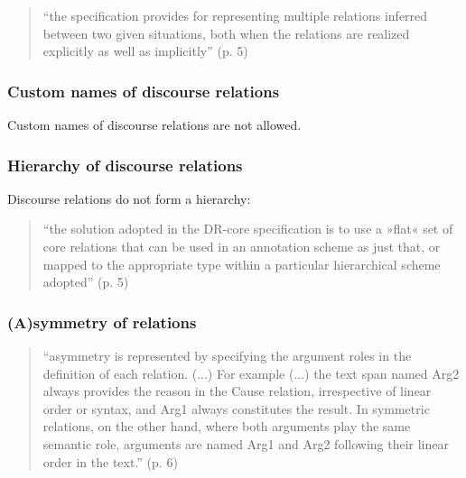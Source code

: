 \documentclass{udisc}
\begin{document}
\begin{itemize}
\begin{quote}
    “the specification provides for representing multiple relations inferred between two given situations, both when the relations are realized explicitly as well as implicitly” (p. 5)
\end{quote}



\subsubsection{Custom names of discourse relations}

Custom names of discourse relations are not allowed.



\subsubsection{Hierarchy of discourse relations}

Discourse relations do not form a hierarchy:

\begin{quote}
    “the solution adopted in the DR-core specification is to use a »flat« set of core relations that can be used in an annotation scheme as just that, or mapped to the appropriate type within a particular hierarchical scheme adopted” (p. 5)
\end{quote}


\subsubsection{(A)symmetry of relations}

\begin{quote}
    “asymmetry is represented by specifying the argument roles in the definition of each relation. (...) For example (...) the text span named Arg2 always provides the reason in the Cause relation, irrespective of linear order or syntax, and Arg1 always constitutes the result. In symmetric relations, on the other hand, where both arguments play the same semantic role, arguments are named Arg1 and Arg2 following their linear order in the text.” (p. 6)
\end{quote}


\end{itemize}
\end{document}
